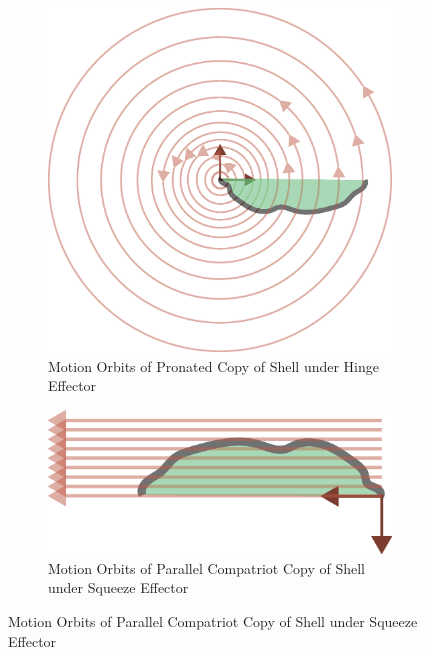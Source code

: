 \documentclass[letterpaper, 10 pt, conference]{ieeeconf}
\begin{document}
 \begin{figure}[ht]
   \begin{subfigure}[t]{0.5\columnwidth}
     \centering
     \includegraphics[width=\linewidth,trim={10cm 5cm 0 5cm},clip]{ShapeForContact_hinge2.eps}
     \caption{\label{fig:rotMot}Motion Orbits of Pronated Copy of Shell under Hinge Effector}
   \end{subfigure}
   \begin{subfigure}[t]{0.5\columnwidth}
     \centering
     \includegraphics[width=\linewidth]{ShapeForContact_jaw.eps}
     \caption{\label{fig:transMot}Motion Orbits of Parallel Compatriot Copy of Shell under Squeeze Effector}
   \end{subfigure}
 \end{figure}
\end{document}
